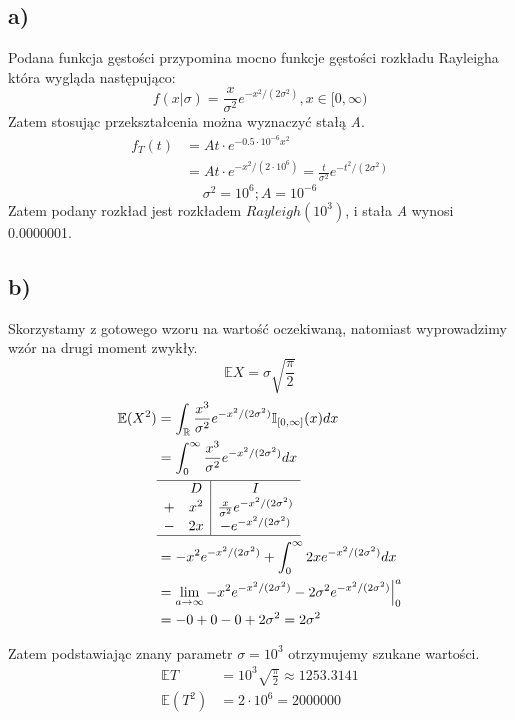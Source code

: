 \documentclass{article}
\begin{document}
\subsection{a)}
Podana funkcja gęstości przypomina mocno funkcje gęstości rozkładu Rayleigha która wygląda następująco:
\[ f(x | \sigma) = \frac{x}{\sigma^2} e^{-x^2 / (2\sigma^2)} , x \in [0,\infty)\]
Zatem stosując przekształcenia można wyznaczyć stałą \textit{A}.
\begin{align*}
f_T(t) & = A t \cdot e^{-0.5 \cdot 10^{-6} x^2} \\
& = A t \cdot e^{-x^2 / ( 2\cdot 10^6) } = \frac{t}{\sigma^2} e^{-t^2 / (2\sigma^2)}
\end{align*}
\[ \sigma^2 = 10^6 ; A = 10^{-6} \]
Zatem podany rozkład jest rozkładem $Rayleigh(10^3)$, i stała \textit{A} wynosi 0.0000001.

\subsection{b)}
Skorzystamy z gotowego wzoru na wartość oczekiwaną, natomiast wyprowadzimy wzór na drugi moment zwykły.
\[ \mathbb{E}X  = \sigma \sqrt{\frac{\pi}{2}} \]
\begin{align*}
\mathbb{E}(X^2) & = \int_{\mathbb{R}} \frac{x^3}{\sigma^2} e^{-x^2 / (2\sigma^2)} \mathbb{I}_{[0,\infty]}(x) dx \\
& =  \int_0^\infty \frac{x^3}{\sigma^2} e^{-x^2 / (2\sigma^2)} dx \\
& \begin{array}{cc|c}
\hline
& D & I \\
+ & x^2 & \frac{x}{\sigma^2} e^{-x^2 / (2\sigma^2)} \\
- & 2x &  -e^{-x^2 / (2\sigma^2)} \\ \hline \end{array} \\
& = -x^2 e^{-x^2 / (2\sigma^2)} + \int_0^\infty 2x e^{-x^2 / (2\sigma^2)} dx \\
& = \lim_{a \rightarrow \infty}  -x^2 e^{-x^2 / (2\sigma^2)} - 2\sigma^2 e^{-x^2 / (2\sigma^2)} \Big\vert_0^a \\
& = - 0 + 0 - 0 + 2\sigma^2 = 2\sigma^2
\end{align*}

Zatem podstawiając znany parametr $\sigma = 10^3$ otrzymujemy szukane wartości.
\begin{align*}
\mathbb{E}T & = 10^3 \sqrt{\frac{\pi}{2}} \approx 1253.3141 \\
\mathbb{E}(T^2) & = 2 \cdot 10^6 = 2000000 
\end{align*}
\end{document}
